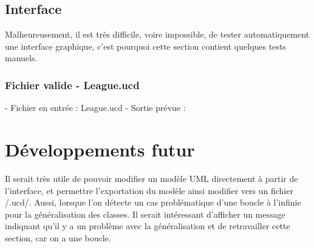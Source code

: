 \documentclass[letter,french]{report}
\begin{document}
  \subsection*{Interface}
  Malheureusement, il est très difficile, voire impossible, de tester
  automatiquement une interface graphique, c'est pourquoi cette section
  contient quelques tests manuels.

  \subsubsection*{Fichier valide - League.ucd}
  - Fichier en entrée : League.ucd
  - Sortie prévue : 

  

	\section*{Développements futur}
	Il serait très utile de pouvoir modifier un modèle UML directement à partir de l'interface,
	et permettre l'exportation du modèle ainsi modifier vers un fichier /.ucd/. Aussi, lorsque l'on détecte un cas problématique d'une boucle à l'infinie pour la généralisation des classes. Il serait intéressant d'afficher un message indiquant qu'il y a un problème avec la généralisation et de retravailler cette section, car on a une boucle. 
	
	
\end{document}
